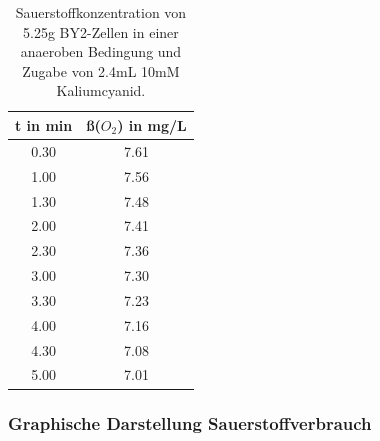 \documentclass[10pt,a4paper]{article}
\begin{document}
	\begin{table}[H]
		\centering
		\caption{Sauerstoffkonzentration von 5.25g BY2-Zellen in einer anaeroben Bedingung und Zugabe von 2.4mL 10mM Kaliumcyanid.}
		\label{tab:O2 BY2 mit KCN}
		\begin{tabular}{cc}
			\toprule
			t in min& ß($O_2$) in mg/L\\
			\midrule
			0.30 & 7.61\\
			1.00 & 7.56\\
			1.30 & 7.48\\
			2.00 & 7.41\\
			2.30 & 7.36 \\
			3.00 & 7.30 \\
			3.30 & 7.23 \\
			4.00 & 7.16\\
			4.30 & 7.08\\
			5.00 & 7.01 \\
			\bottomrule
		\end{tabular}
	\end{table}	
	\subsubsection{Graphische Darstellung Sauerstoffverbrauch}
	
\end{document}
